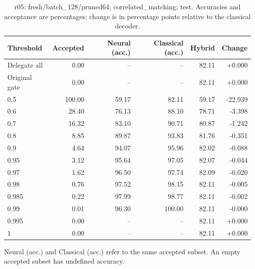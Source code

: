 \begin{table}[htbp]
\centering\small
\setlength{\tabcolsep}{3pt}
\caption{r05: fresh/batch\_128/pruned64; correlated\_matching; test. Accuracies and acceptance are percentages; change is in percentage points relative to the classical decoder.}
\begin{tabular}{lrrrrr}
\toprule
Threshold & Accepted & Neural (acc.) & Classical (acc.) & Hybrid & Change \\
\midrule
Delegate all & 0.00 & -- & -- & 82.11 & +0.000 \\
Original gate & 0.00 & -- & -- & 82.11 & +0.000 \\
0.5 & 100.00 & 59.17 & 82.11 & 59.17 & -22.939 \\
0.6 & 28.40 & 76.13 & 88.10 & 78.71 & -3.398 \\
0.7 & 16.32 & 83.10 & 90.71 & 80.87 & -1.242 \\
0.8 & 8.85 & 89.87 & 93.83 & 81.76 & -0.351 \\
0.9 & 4.64 & 94.07 & 95.96 & 82.02 & -0.088 \\
0.95 & 3.12 & 95.64 & 97.05 & 82.07 & -0.044 \\
0.97 & 1.62 & 96.50 & 97.74 & 82.09 & -0.020 \\
0.98 & 0.76 & 97.52 & 98.15 & 82.11 & -0.005 \\
0.985 & 0.22 & 97.99 & 98.77 & 82.11 & -0.002 \\
0.99 & 0.01 & 96.30 & 100.00 & 82.11 & -0.000 \\
0.995 & 0.00 & -- & -- & 82.11 & +0.000 \\
1 & 0.00 & -- & -- & 82.11 & +0.000 \\
\bottomrule
\end{tabular}
\par\smallskip\footnotesize Neural (acc.) and Classical (acc.) refer to the same accepted subset. An empty accepted subset has undefined accuracy.
\end{table}
